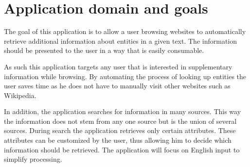 \section{Application domain and goals}
The goal of this application is to allow a user browsing websites to automatically retrieve additional information about entities in a given text. The information should be presented to the user in a way that is easily consumable. 

As such this application targets any user that is interested in supplementary information while browsing. By automating the process of looking up entities the user saves time as he does not have to manually visit other websites such as Wikipedia. 

In addition, the application searches for information in many sources. This way the information does not stem from any one source but is the union of several sources.  During search the application retrieves only certain attributes. These attributes can be customized by the user, thus allowing him to decide which information should be retrieved. The application will focus on English input to simplify processing.



